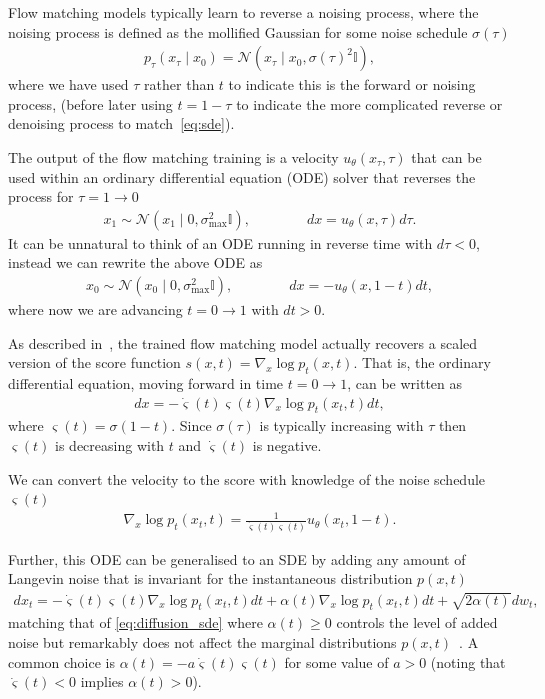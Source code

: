 \documentclass[pra,showpacs,amsmath,amssymb,amsfonts,lengthcheck,longbibliography,onecolumn]{revtex4-2}
\begin{document}
Flow matching models \cite{karras2022elucidating} typically learn to reverse a noising process, where the noising
process is defined as the mollified Gaussian for some noise schedule $\sigma(\tau)$
\begin{align*}
p_\tau(x_\tau \mid x_0) = \mathcal{N}(x_\tau \mid x_0, \sigma(\tau)^2 \mathbb{I}),
\end{align*}
where we have used $\tau$ rather than $t$ to indicate this is the forward or noising process,
(before later using $t=1-\tau$ to indicate the more complicated reverse or denoising process to match~\eqref{eq:sde}).

The output of the flow matching training is a velocity $u_\theta(x_\tau, \tau)$ that can be
used within an ordinary differential equation (ODE) solver that reverses the process for $\tau=1 \to 0$
\begin{align*}
x_1 \sim \mathcal{N}(x_1 \mid 0, \sigma_\text{max}^2 \mathbb{I}), \qquad \qquad dx = u_\theta(x, \tau)d\tau.
\end{align*}
It can be unnatural to think of an ODE running in reverse time with $d\tau < 0$,
instead we can rewrite the above ODE as
\begin{align*}
x_0 \sim \mathcal{N}(x_0 \mid 0, \sigma_\text{max}^2 \mathbb{I}), \qquad \qquad dx = -u_\theta(x, 1-t)dt,
\end{align*}
where now we are advancing $t=0 \to 1$ with $dt > 0$.

As described in~\cite{karras2022elucidating}, the trained flow matching model actually
recovers a scaled version of the score function $s(x, t) = \nabla_x \log p_t(x, t)$.
That is, the ordinary differential equation, moving forward in time $t=0\to1$, can be written as
\begin{align*}
dx = -\dot{\varsigma}(t) \varsigma(t)\nabla_x \log p_t(x_t, t) dt,
\end{align*}
where $\varsigma(t) = \sigma(1-t)$. Since $\sigma(\tau)$ is typically increasing with $\tau$ then $\varsigma(t)$ is decreasing with $t$ and $\dot{\varsigma}(t)$ is negative. 

We can convert the velocity to the score with knowledge of the noise schedule $\varsigma(t)$
\begin{align*}
\nabla_x \log p_t(x_t, t) = \frac{1}{\dot{\varsigma}(t)\varsigma(t)}u_\theta(x_t, 1-t).
\end{align*}

Further, this ODE can be generalised to an SDE by adding any amount of Langevin noise
that is invariant for the instantaneous distribution $p(x,t)$~\cite{ma2015complete}
\begin{align*}
dx_t = -\dot{\varsigma}(t) \varsigma(t)\nabla_x \log p_t(x_t, t) dt 
+ \alpha(t)\nabla_x \log p_t(x_t, t) dt + \sqrt{2 \alpha(t)}dw_t,
\end{align*}
matching that of \eqref{eq:diffusion_sde} where $\alpha(t) \geq 0$ controls the level of added noise but
remarkably does not affect the marginal distributions $p(x,t)$~\cite{karras2022elucidating, duffield2026complete}. A common choice is $\alpha(t) = - a \dot{\varsigma}(t) \varsigma(t)$ for some value of $a > 0$ (noting that $\dot{\varsigma}(t) <0$ implies $\alpha(t)>0$).
\end{document}
